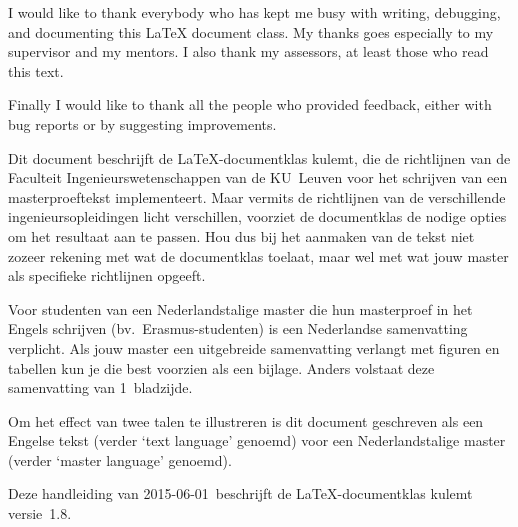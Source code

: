 \documentclass[master=elt,masteroption=im,english,oneside]{kulemt}
\newcommand*\classversion{1.8}
\newcommand*\manualdate{2015-06-01}
\newcommand*\cls[1]{\textsf{#1}}
\newcommand\English[1]{`\foreignlanguage{english}{#1}'}
\begin{document}
\begin{preface}
  I would like to thank everybody who has kept me busy with writing,
  debugging, and documenting this LaTeX document class. My thanks goes
  especially to my supervisor and my mentors. I also thank my assessors,
  at least those who read this text.

  Finally I would like to thank all the people who provided feedback,
  either with bug reports or by suggesting improvements.
\end{preface}

\tableofcontents*

\begin{abstract}
  This document describes the use of the LaTeX document class \cls{kulemt},
  which implements the KU~Leuven Faculty of Engineering guidelines for
  writing a master thesis. Since there are slight differences between the
  actual guidelines of the different engineering masters, this class
  implements not only the common part, but it also provides the necessary
  options to adapt it to the specific requirements. So please check the
  guidelines of your master before using or tweaking typesetting options.

  To illustrate the difference between the main text language and the
  master language, this document is written in English (as the main text
  language) for a Dutch master.

  This manual (dated \manualdate) describes the \cls{kulemt} class
  version~\classversion.
\end{abstract}

\begin{abstract*}
  Dit document beschrijft de LaTeX-documentklas \cls{kulemt}, die de
  richtlijnen van de Faculteit Ingenieurswetenschappen van de KU~Leuven
  voor het schrijven van een masterproeftekst implementeert. Maar vermits
  de richtlijnen van de verschillende ingenieursopleidingen licht
  verschillen, voorziet de documentklas de nodige opties om het resultaat
  aan te passen. Hou dus bij het aanmaken van de tekst niet zozeer rekening
  met wat de documentklas toelaat, maar wel met wat jouw master als
  specifieke richtlijnen opgeeft.

  Voor studenten van een Nederlandstalige master die hun masterproef in het
  Engels schrijven (bv.\ Erasmus-studenten) is een Nederlandse samenvatting
  verplicht. Als jouw master een uitgebreide samenvatting verlangt met
  figuren en tabellen kun je die best voorzien als een bijlage. Anders
  volstaat deze samenvatting van 1~bladzijde.

  Om het effect van twee talen te illustreren is dit document geschreven
  als een Engelse tekst (verder \English{text language} genoemd) voor een
  Nederlandstalige master (verder \English{master language} genoemd).

  Deze handleiding van \manualdate\ beschrijft de LaTeX-documentklas
  \cls{kulemt} versie~\classversion.
\end{abstract*}

\listoffiguresandtables

\mainmatter



%

\appendix
\appendixpage*




\backmatter





\end{document}
